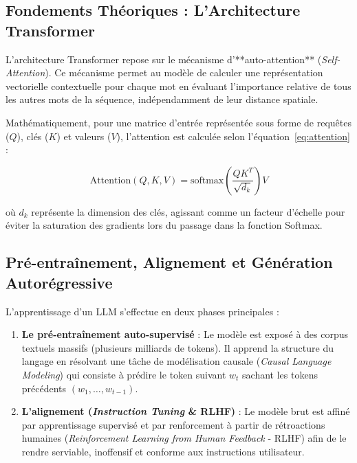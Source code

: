 \subsection{Fondements Théoriques : L'Architecture Transformer}
L'architecture Transformer repose sur le mécanisme d'**auto-attention** (\textit{Self-Attention}). Ce mécanisme permet au modèle de calculer une représentation vectorielle contextuelle pour chaque mot en évaluant l'importance relative de tous les autres mots de la séquence, indépendamment de leur distance spatiale.

Mathématiquement, pour une matrice d'entrée représentée sous forme de requêtes ($Q$), clés ($K$) et valeurs ($V$), l'attention est calculée selon l'équation~\ref{eq:attention} :

\begin{equation}
\label{eq:attention}
\text{Attention}(Q, K, V) = \text{softmax}\left(\frac{QK^T}{\sqrt{d_k}}\right)V
\end{equation}

où $d_k$ représente la dimension des clés, agissant comme un facteur d'échelle pour éviter la saturation des gradients lors du passage dans la fonction Softmax.

\subsection{Pré-entraînement, Alignement et Génération Autorégressive}
L'apprentissage d'un LLM s'effectue en deux phases principales :
\begin{enumerate}
    \item \textbf{Le pré-entraînement auto-supervisé} : Le modèle est exposé à des corpus textuels massifs (plusieurs milliards de tokens). Il apprend la structure du langage en résolvant une tâche de modélisation causale (\textit{Causal Language Modeling}) qui consiste à prédire le token suivant $w_t$ sachant les tokens précédents $(w_1, \dots, w_{t-1})$.
    \item \textbf{L'alignement (\textit{Instruction Tuning} \& RLHF)} : Le modèle brut est affiné par apprentissage supervisé et par renforcement à partir de rétroactions humaines (\textit{Reinforcement Learning from Human Feedback} - RLHF) afin de le rendre serviable, inoffensif et conforme aux instructions utilisateur.
\end{enumerate}

